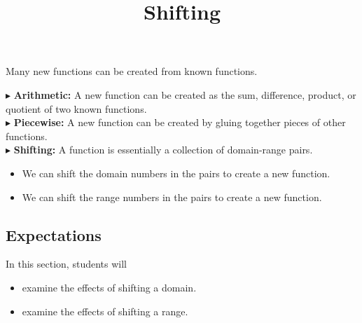 \documentclass{ximera}
\title{Shifting}
\begin{document}
\begin{abstract}
\end{abstract}
\maketitle





Many new functions can be created from known functions.


$\blacktriangleright$ \textbf{Arithmetic:} A new function can be created as the sum, difference, product, or quotient of two known functions. \\


$\blacktriangleright$ \textbf{Piecewise:} A new function can be created by gluing together pieces of other functions.  \\


$\blacktriangleright$ \textbf{Shifting:}  A function is essentially a collection of domain-range pairs.  


\begin{itemize}
\item We can shift the domain numbers in the pairs to create a new function.
\item We can shift the range numbers in the pairs to create a new function.
\end{itemize}




\subsection{Expectations}


\begin{sectionOutcomes}
In this section, students will 

\begin{itemize}
\item examine the effects of shifting a domain.
\item examine the effects of shifting a range.
\end{itemize}
\end{sectionOutcomes}
\end{document}
